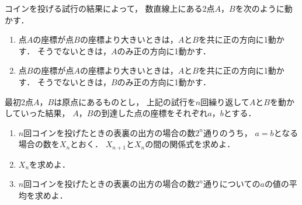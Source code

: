 \documentclass[../../main.tex]{subfiles}
\begin{document}
コインを投げる試行の結果によって，
数直線上にある2点$A$，$B$を次のように動かす．
\begin{enumerate}
  \item [表が出た場合：]点$A$の座標が点$B$の座標より大きいときは，$A$と$B$を共に正の方向に1動かす．
    そうでないときは，$A$のみ正の方向に1動かす．
  \item [裏が出た場合：]点$B$の座標が点$A$の座標より大きいときは，$A$と$B$を共に正の方向に1動かす．
    そうでないときは，$B$のみ正の方向に1動かす．
\end{enumerate}
最初2点$A$，$B$は原点にあるものとし，
上記の試行を$n$回繰り返して$A$と$B$を動かしていった結果，
$A$，$B$の到達した点の座標をそれぞれ$a$，$b$とする．
\begin{enumerate}
  \item $n$回コインを投げたときの表裏の出方の場合の数$2^n$通りのうち，
    $a=b$となる場合の数を$X_n$とおく．
    $X_{n+1}$と$X_n$の間の関係式を求めよ．
  \item $X_n$を求めよ．
  \item $n$回コインを投げたときの表裏の出方の場合の数$2^n$通りについての$a$の値の平均を求めよ．
\end{enumerate}
\end{document}
